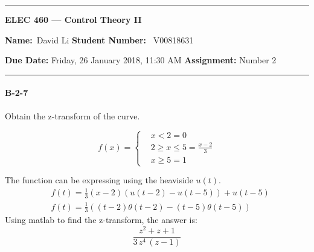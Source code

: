 \begin{center}
	\hrule
	\vspace{.4cm}
	{\textbf { \large ELEC 460 --- Control Theory II}}
\end{center}
{\textbf{Name:}\ David Li \hspace{\fill} \textbf{Student Number:}} \ V00818631  \\
{\textbf{Due Date:} Friday, 26 January 2018, 11:30 AM \hspace{\fill} \textbf{Assignment:} Number 2 \\
	\hrule
	
\paragraph{B-2-7}
Obtain the z-transform of the curve.

\[
f(x)=
\begin{cases}
& x < 2  = 0\\
& 2 \geq x \leq 5 = \frac{x-2}{3} \\
& x \geq 5 = 1
\end{cases}
\]
 \vspace{-1cm}
\begin{figure}[H]
	\centering
\end{figure}

The function can be expressing using the heaviside $u(t)$.
\begin{align*}
& f(t) = \frac{1}{3}(x-2) (u(t-2)-u(t-5)) + u(t-5) \\
& f(t) = \frac{1}{3}((t-2)\theta(t-2)-(t-5)\theta(t-5)) 
\end{align*}
Using matlab to find the z-transform, the answer is:
\[
\frac{z^2+z+1}{3\,z^4\,\left(z-1\right)}
\]

}
